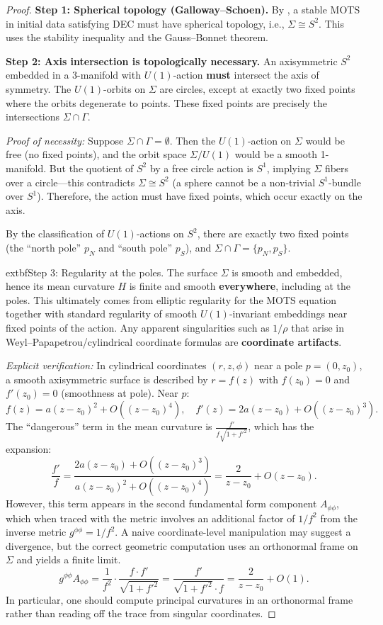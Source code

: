 \begin{proof}
\textbf{Step 1: Spherical topology (Galloway--Schoen).} By \cite[Theorem 1]{gallowayschoen2006}, a stable MOTS in initial data satisfying DEC must have spherical topology, i.e., $\Sigma \cong S^2$. This uses the stability inequality and the Gauss--Bonnet theorem.

\textbf{Step 2: Axis intersection is topologically necessary.}
An axisymmetric $S^2$ embedded in a 3-manifold with $U(1)$-action \textbf{must} intersect the axis of symmetry. The $U(1)$-orbits on $\Sigma$ are circles, except at exactly two fixed points where the orbits degenerate to points. These fixed points are precisely the intersections $\Sigma \cap \Gamma$.

\textit{Proof of necessity:} Suppose $\Sigma \cap \Gamma = \emptyset$. Then the $U(1)$-action on $\Sigma$ would be free (no fixed points), and the orbit space $\Sigma/U(1)$ would be a smooth 1-manifold. But the quotient of $S^2$ by a free circle action is $S^1$, implying $\Sigma$ fibers over a circle---this contradicts $\Sigma \cong S^2$ (a sphere cannot be a non-trivial $S^1$-bundle over $S^1$). Therefore, the action must have fixed points, which occur exactly on the axis.

By the classification of $U(1)$-actions on $S^2$, there are exactly two fixed points (the ``north pole'' $p_N$ and ``south pole'' $p_S$), and $\Sigma \cap \Gamma = \{p_N, p_S\}$.

	extbf{Step 3: Regularity at the poles.}
The surface $\Sigma$ is smooth and embedded, hence its mean curvature $H$ is finite and smooth \textbf{everywhere}, including at the poles. This ultimately comes from elliptic regularity for the MOTS equation together with standard regularity of smooth $U(1)$-invariant embeddings near fixed points of the action. Any apparent singularities such as $1/\rho$ that arise in Weyl--Papapetrou/cylindrical coordinate formulas are \textbf{coordinate artifacts}.

\textit{Explicit verification:} In cylindrical coordinates $(r, z, \phi)$ near a pole $p = (0, z_0)$, a smooth axisymmetric surface is described by $r = f(z)$ with $f(z_0) = 0$ and $f'(z_0) = 0$ (smoothness at pole). Near $p$:
\[
f(z) = a(z - z_0)^2 + O((z-z_0)^4), \quad f'(z) = 2a(z-z_0) + O((z-z_0)^3).
\]
The ``dangerous'' term in the mean curvature is $\frac{f'}{f \sqrt{1+f'^2}}$, which has the expansion:
\[
\frac{f'}{f} = \frac{2a(z-z_0) + O((z-z_0)^3)}{a(z-z_0)^2 + O((z-z_0)^4)} = \frac{2}{z-z_0} + O(z-z_0).
\]
However, this term appears in the second fundamental form component $A_{\phi\phi}$, which when traced with the metric involves an additional factor of $1/f^2$ from the inverse metric $g^{\phi\phi} = 1/f^2$. A naive coordinate-level manipulation may suggest a divergence, but the correct geometric computation uses an orthonormal frame on $\Sigma$ and yields a finite limit.
\[
g^{\phi\phi} A_{\phi\phi} = \frac{1}{f^2} \cdot \frac{f \cdot f'}{\sqrt{1+f'^2}} = \frac{f'}{\sqrt{1+f'^2} \cdot f} = \frac{2}{z-z_0} + O(1).
\]
In particular, one should compute principal curvatures in an orthonormal frame rather than reading off the trace from singular coordinates.


\end{proof}
